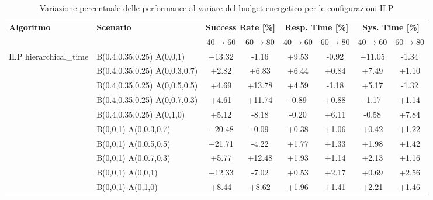 \documentclass[12pt]{article}
\begin{document}
\begin{table}[h]
\centering
\caption{Variazione percentuale delle performance al variare del budget energetico per le configurazioni ILP}
\label{tab:ilp_variation}
\scriptsize
\begin{tabular}{llcccccc}
\toprule
\textbf{Algoritmo} & \textbf{Scenario} 
& \multicolumn{2}{c}{\textbf{Success Rate [\%]}} 
& \multicolumn{2}{c}{\textbf{Resp. Time [\%]}} 
& \multicolumn{2}{c}{\textbf{Sys. Time [\%]}} \\
\cmidrule(lr){3-4} \cmidrule(lr){5-6} \cmidrule(lr){7-8}
& & 40$\rightarrow$60 & 60$\rightarrow$80 
& 40$\rightarrow$60 & 60$\rightarrow$80 
& 40$\rightarrow$60 & 60$\rightarrow$80 \\
\midrule

\multirow{10}{*}{ILP hierarchical\_time}
& B(0.4,0.35,0.25) A(0,0,1)     & +13.32 & -1.16 & +9.53 & -0.92 & +11.05 & -1.34 \\
& B(0.4,0.35,0.25) A(0,0.3,0.7) & +2.82 & +6.83 & +6.44 & +0.84 & +7.49 & +1.10 \\
& B(0.4,0.35,0.25) A(0,0.5,0.5) & +4.69 & +13.78 & +4.59 & -1.18 & +5.17 & -1.32 \\
& B(0.4,0.35,0.25) A(0,0.7,0.3) & +4.61 & +11.74 & -0.89 & +0.88 & -1.17 & +1.14 \\
& B(0.4,0.35,0.25) A(0,1,0)     & +5.12 & -8.18 & -0.20 & +6.11 & -0.58 & +7.84 \\
& B(0,0,1) A(0,0.3,0.7)         & +20.48 & -0.09 & +0.38 & +1.06 & +0.42 & +1.22 \\
& B(0,0,1) A(0,0.5,0.5)         & +21.71 & -4.22 & +1.77 & +1.33 & +1.98 & +1.42 \\
& B(0,0,1) A(0,0.7,0.3)         & +5.77 & +12.48 & +1.93 & +1.14 & +2.13 & +1.16 \\
& B(0,0,1) A(0,0,1)             & +12.33 & -7.02 & +0.53 & +2.17 & +0.69 & +2.56 \\
& B(0,0,1) A(0,1,0)             & +8.44 & +8.62 & +1.96 & +1.41 & +2.21 & +1.46 \\
\midrule


\end{tabular}
\end{table}
\end{document}
